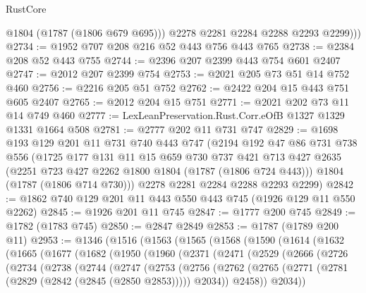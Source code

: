 \begin{lexlean}{RustCore}
\begin{coremodule}
            @1804
            (@1787 (@1806 @679 @695)))
          @2278
          @2281
          @2284
          @2288
          @2293
          @2299)))
@2734 := @1952 @707 @208 @216 @52 @443 @756 @443 @765
@2738 := @2384 @208 @52 @443 @755
@2744 := @2396 @207 @2399 @443 @754 @601 @2407
@2747 := @2012 @207 @2399 @754
@2753 := @2021 @205 @73 @51 @14 @752 @460
@2756 := @2216 @205 @51 @752
@2762 := @2422 @204 @15 @443 @751 @605 @2407
@2765 := @2012 @204 @15 @751
@2771 := @2021 @202 @73 @11 @14 @749 @460
@2777 := LexLeanPreservation.Rust.Corr.eOfB @1327 @1329 @1331 @1664 @508
@2781 := @2777 @202 @11 @731 @747
@2829 := @1698
    @193
    @129
    @201
    @11
    @731
    @740
    @443
    @747
    (@2194
      @192
      @47
      @86
      @731
      @738
      @556
      (@1725
        @177
        @131
        @11
        @15
        @659
        @730
        @737
        @421
        @713
        @427
        @2635
        (@2251 @723 @427 @2262 @1800 @1804 (@1787 (@1806 @724 @443)))
        @1804
        (@1787 (@1806 @714 @730)))
      @2278
      @2281
      @2284
      @2288
      @2293
      @2299)
@2842 := @1862 @740 @129 @201 @11 @443 @550 @443 @745 (@1926 @129 @11 @550 @2262)
@2845 := @1926 @201 @11 @745
@2847 := @1777 @200 @745
@2849 := @1782 (@1783 @745)
@2850 := @2847 @2849
@2853 := @1787 (@1789 @200 @11)
@2953 := @1346
    (@1516
      (@1563
        (@1565
          (@1568
            (@1590
              (@1614
                (@1632
                  (@1665
                    (@1677
                      (@1682
                        (@1950
                          (@1960
                            (@2371
                              (@2471
                                (@2529
                                  (@2666
                                    (@2726
                                      (@2734
                                        (@2738
                                          (@2744
                                            (@2747
                                              (@2753
                                                (@2756
                                                  (@2762
                                                    (@2765
                                                      (@2771
                                                        (@2781
                                                          (@2829 (@2842 (@2845 (@2850 @2853)))))
                                                        @2034))
                                                    @2458))
                                                @2034))

\end{coremodule}
\end{lexlean}
